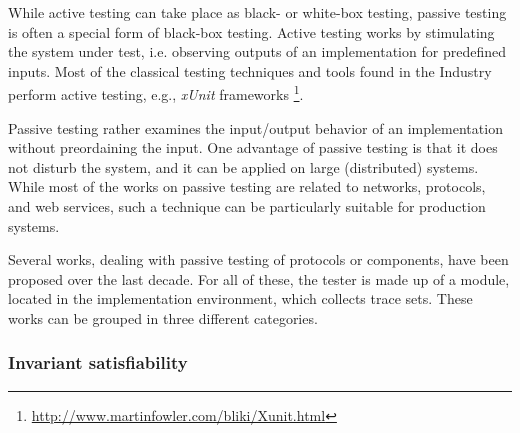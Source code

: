 While active testing can take place as black- or white-box
testing, passive testing is often a special form of black-box
testing. Active testing works by stimulating the system under
test, i.e. observing outputs of an implementation for predefined
inputs. Most of the classical testing techniques and tools found
in the Industry perform active testing, e.g., \textit{xUnit}
frameworks
\footnote{\url{http://www.martinfowler.com/bliki/Xunit.html}}.

Passive testing rather examines the input/output behavior of an
implementation without preordaining the input. One advantage of
passive testing is that it does not disturb the system, and it
can be applied on large (distributed) systems. While most of the
works on passive testing are related to networks, protocols, and
web services, such a technique can be particularly suitable for
production systems.

Several works, dealing with passive testing of protocols or
components, have been proposed over the last decade. For all of
these, the tester is made up of a module, located in the
implementation environment, which collects trace sets. These
works can be grouped in three different categories.

\subsubsection{Invariant satisfiability}

